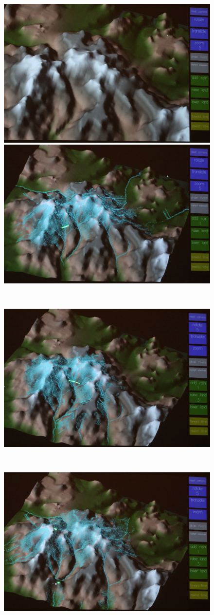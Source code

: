 \documentclass[review]{vgtc}                 %
\begin{document}
\begin{figure}[t]
  \begin{center}
  \begin{minipage}{0.99\linewidth}
    \includegraphics[width=0.49\linewidth]{images/terrain1.jpg}
    \includegraphics[width=0.49\linewidth]{images/terrain2.jpg}
  \end{minipage}  \\
  \begin{minipage}{0.99\linewidth}
    \includegraphics[width=0.99\linewidth]{images/terrain3.jpg}     
  \end{minipage}  \\
  \begin{minipage}{0.99\linewidth}
    \includegraphics[width=0.49\linewidth]{images/terrain4.jpg}

\end{minipage}
\end{center}
\end{figure}
\end{document}
